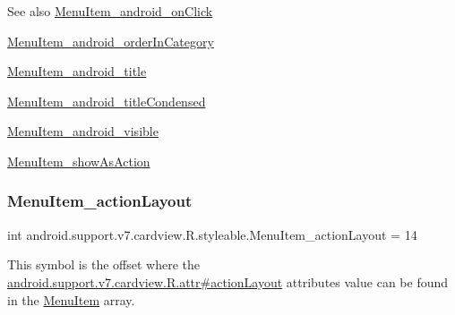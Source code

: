 \begin{DoxySeeAlso}{See also}
\hyperlink{classandroid_1_1support_1_1v7_1_1cardview_1_1R_1_1styleable_aa97c42d3174b202111467c1fe2920610}{Menu\+Item\+\_\+android\+\_\+on\+Click} 

\hyperlink{classandroid_1_1support_1_1v7_1_1cardview_1_1R_1_1styleable_ada576758c86c3071f0ebb59174263f7f}{Menu\+Item\+\_\+android\+\_\+order\+In\+Category} 

\hyperlink{classandroid_1_1support_1_1v7_1_1cardview_1_1R_1_1styleable_a36a1820cff371662c8af1f52b31283cc}{Menu\+Item\+\_\+android\+\_\+title} 

\hyperlink{classandroid_1_1support_1_1v7_1_1cardview_1_1R_1_1styleable_a32c62ba80fc355b96520c8ff294be6ea}{Menu\+Item\+\_\+android\+\_\+title\+Condensed} 

\hyperlink{classandroid_1_1support_1_1v7_1_1cardview_1_1R_1_1styleable_a511269a83c8ff86f1563f6ee710e8662}{Menu\+Item\+\_\+android\+\_\+visible} 

\hyperlink{classandroid_1_1support_1_1v7_1_1cardview_1_1R_1_1styleable_a5eae947f3c7e674fa7b5cf9b10a4aac4}{Menu\+Item\+\_\+show\+As\+Action} 
\end{DoxySeeAlso}
\mbox{\label{classandroid_1_1support_1_1v7_1_1cardview_1_1R_1_1styleable_afc66347211033a94261991c2716632bc}} 
\subsubsection{\texorpdfstring{Menu\+Item\+\_\+action\+Layout}{MenuItem\_actionLayout}}
{\footnotesize\ttfamily int android.\+support.\+v7.\+cardview.\+R.\+styleable.\+Menu\+Item\+\_\+action\+Layout = 14\hspace{0.3cm}{\ttfamily [static]}}

This symbol is the offset where the \hyperlink{classandroid_1_1support_1_1v7_1_1cardview_1_1R_1_1attr_a59e5c3de19788e52be3769f63ce16173}{android.\+support.\+v7.\+cardview.\+R.\+attr\#action\+Layout} attribute\textquotesingle{}s value can be found in the \hyperlink{classandroid_1_1support_1_1v7_1_1cardview_1_1R_1_1styleable_a0a483b830af809d94b22d4901e758447}{Menu\+Item} array.

